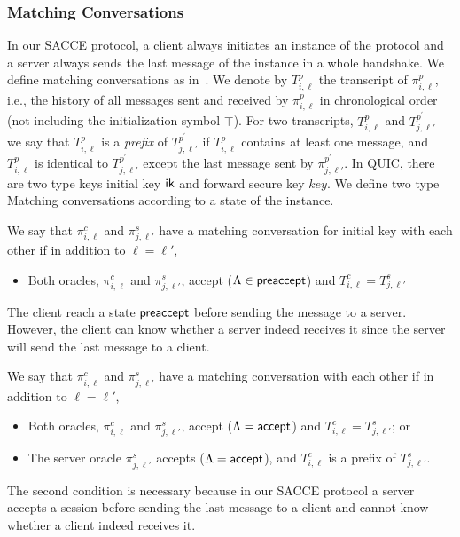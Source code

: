 \subsubsection{Matching Conversations}
In our SACCE protocol, a client always initiates an
instance of the protocol and a server always sends the
last message of the instance in a whole handshake.
We define matching conversations as in~\cite{JKSS12:ACCE}.
We denote by $T^p_{i,\ell}$ the transcript of
$\pi^p_{i,\ell}$, i.e., the history of all messages sent
and received by $\pi^p_{i,\ell}$ in chronological order
(not including the initialization-symbol $\top$).
For two transcripts, $T^p_{i,\ell}$ and
$T^{p^{\prime}}_{j,\ell'}$ we say that $T^p_{i,\ell}$
is a \textit{prefix} of $T^{p^{\prime}}_{j,\ell'}$ if
$T^p_{i,\ell}$ contains at least one message, and
$T^p_{i,\ell}$ is identical to
$T^{p^{\prime}}_{j,\ell'}$ except the last message sent
by $\pi^{p^{\prime}}_{j,\ell'}$.
In QUIC, there are two type keys initial key $\mathsf{ik}$ and
forward secure key $key$.
We define two type Matching conversations according to
a state of the instance.

\begin{definition}
 We say that $\pi^c_{i,\ell}$ and $\pi^s_{j,\ell'}$ have
 a matching conversation for initial key with each other if
 in addition to $\ell=\ell'$,
 \begin{itemize}
  \item{Both oracles, $\pi^c_{i, \ell}$ and
  $\pi^s_{j,\ell'}$, accept ($\Lambda \in \mathsf{preaccept}$) and
  $T^c_{i,\ell} = T^s_{j,\ell'}$}
 \end{itemize}
\end{definition}
\begin{remark}
 The client reach a state $\mathsf{preaccept}$ before sending the
 message to a server. However, the client can know whether
 a server indeed receives it since the server will send the
 last message to a client.
\end{remark}
\begin{definition}
 We say that $\pi^c_{i,\ell}$ and $\pi^s_{j,\ell'}$ have
 a matching conversation with each other if in addition
 to $\ell=\ell'$,
 \begin{itemize}
  \item{Both oracles, $\pi^c_{i, \ell}$ and
  $\pi^s_{j,\ell'}$, accept ($\Lambda = \mathsf{accept}$) and
  $T^c_{i,\ell} = T^s_{j,\ell'}$; or}

  \item{The server oracle $\pi^s_{j, \ell'}$ accepts
  ($\Lambda = \mathsf{accept}$),
  and $T^c_{i,\ell}$ is a prefix of $T^s_{j,\ell'}$.}
 \end{itemize}
\end{definition}
\begin{remark}
 The second condition is necessary because in our SACCE
 protocol a server accepts a session before sending the
 last message to a client and cannot know whether a
 client indeed receives it.
\end{remark}

